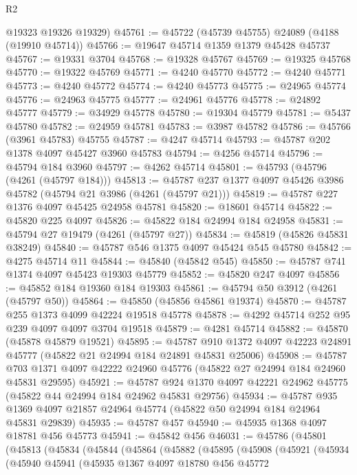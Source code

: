\begin{lexlean}{R2}
\begin{coremodule}
      @19323
      @19326
      @19329)
@45761 := @45722 (@45739 @45755) @24089 (@4188 (@19910 @45714))
@45766 := @19647 @45714 @1359 @1379 @45428 @45737
@45767 := @19331 @3704
@45768 := @19328 @45767
@45769 := @19325 @45768
@45770 := @19322 @45769
@45771 := @4240 @45770
@45772 := @4240 @45771
@45773 := @4240 @45772
@45774 := @4240 @45773
@45775 := @24965 @45774
@45776 := @24963 @45775
@45777 := @24961 @45776
@45778 := @24892 @45777
@45779 := @34929 @45778
@45780 := @19304 @45779
@45781 := @5437 @45780
@45782 := @24959 @45781
@45783 := @3987 @45782
@45786 := @45766 (@3961 @45783) @45755
@45787 := @4247 @45714
@45793 := @45787 @202 @1378 @4097 @45427 @3960 @45783
@45794 := @4256 @45714
@45796 := @45794 @184 @3960
@45797 := @4262 @45714
@45801 := @45793 (@45796 (@4261 (@45797 @184)))
@45813 := @45787 @237 @1377 @4097 @45426 @3986 @45782 (@45794 @21 @3986 (@4261 (@45797 @21)))
@45819 := @45787 @227 @1376 @4097 @45425 @24958 @45781
@45820 := @18601 @45714
@45822 := @45820 @225 @4097
@45826 := @45822 @184 @24994 @184 @24958
@45831 := @45794 @27 @19479 (@4261 (@45797 @27))
@45834 := @45819 (@45826 @45831 @38249)
@45840 := @45787 @546 @1375 @4097 @45424 @545 @45780
@45842 := @4275 @45714 @11
@45844 := @45840 (@45842 @545)
@45850 := @45787 @741 @1374 @4097 @45423 @19303 @45779
@45852 := @45820 @247 @4097
@45856 := @45852 @184 @19360 @184 @19303
@45861 := @45794 @50 @3912 (@4261 (@45797 @50))
@45864 := @45850 (@45856 @45861 @19374)
@45870 := @45787 @255 @1373 @4099 @42224 @19518 @45778
@45878 := @4292 @45714 @252 @95 @239 @4097 @4097 @3704 @19518
@45879 := @4281 @45714
@45882 := @45870 (@45878 @45879 @19521)
@45895 := @45787 @910 @1372 @4097 @42223 @24891 @45777 (@45822 @21 @24994 @184 @24891 @45831 @25006)
@45908 := @45787 @703 @1371 @4097 @42222 @24960 @45776 (@45822 @27 @24994 @184 @24960 @45831 @29595)
@45921 := @45787 @924 @1370 @4097 @42221 @24962 @45775 (@45822 @44 @24994 @184 @24962 @45831 @29756)
@45934 := @45787 @935 @1369 @4097 @21857 @24964 @45774 (@45822 @50 @24994 @184 @24964 @45831 @29839)
@45935 := @45787 @457
@45940 := @45935 @1368 @4097 @18781 @456 @45773
@45941 := @45842 @456
@46031 := @45786
    (@45801
      (@45813
        (@45834
          (@45844
            (@45864
              (@45882
                (@45895
                  (@45908
                    (@45921
                      (@45934
                        (@45940
                          @45941
                          (@45935
                            @1367
                            @4097
                            @18780
                            @456
                            @45772

\end{coremodule}
\end{lexlean}
